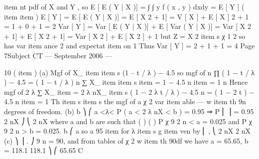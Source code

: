 item nt pdf of X and Y , so
E [ E ( Y | X )] = ∫ ∫ y f ( x , y ) dxdy = E [ Y ]
(%
item %
item )
E [ Y ] = E [ E ( Y | X )] = E [ X 2 + 1]
= V [ X ] + { E [ X ]} 2 + 1 = 1 + 0 + 1 = 2
Var [ Y ] = Var [ E ( Y | X )] + E [ Var ( Y | X )] = Var [ X 2 + 1] + E [ X 2 + 1]
= Var [ X 2 ] + E [ X 2 ] + 1
but Z = X 2 %
item s χ 1 2 so has var%
item ance 2 and expectat%
item on 1
Thus Var [ Y ] = 2 + 1 + 1 = 4
Page 7Subject CT  — September 2006 — 

10
(%
item )
(a)
Mgf of X_{%
item } %
item s (1 – t / λ ) − 4.5 so mgf of
n
∏ ( 1 − t / λ )
− 4.5
= ( 1 − t / λ )
n
∑ X_{%
item }
item s
item  = 1
− 4.5 n
item  = 1
n
Hence mgf of 2 λ ∑ X_{%
item } = 2 λ nX_{%
item }s ( 1 − 2 λ t / λ )
− 4.5 n
= ( 1 − 2 t )
− 4.5 n
item  = 1
Th%
item s %
item s the mgf of a χ 2 var%
item able — w%
item th 9n degrees of freedom.
(b)
b ⎞
⎛ a
<λ<
P ( a < 2 λ nX < b ) = 0.95 ⇒ P ⎜
⎟ = 0.95
2 nX ⎠
⎝ 2 nX
where a and b are such that
(
)
(
)
P χ 9 2 n < a = 0.025 and P χ 9 2 n > b = 0.025.
b
⎛ a
so a 95%
item  for λ %
item s g%
item ven by ⎜
,
⎝ 2 nX 2 nX
(c)
⎞
⎟ .
⎠
9 n = 90, and from tables of χ 2 w%
item th 90df we have a = 65.65, b = 118.1
118.1 ⎞
⎛ 65.65
C%

